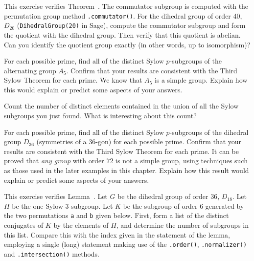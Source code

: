 \begin{sageverbatim}\end{sageverbatim}
%
%
This exercise verifies Theorem~.  The commutator subgroup is computed with the permutation group method \verb?.commutator()?.  For the dihedral group of order 40, $D_{20}$ (\verb?DihedralGroup(20)? in Sage), compute the commutator subgroup and form the quotient with the dihedral group.  Then verify that this quotient is abelian.  Can you identify the quotient group exactly (in other words, up to isomorphism)?
\begin{sageverbatim}\end{sageverbatim}
%
%
For each possible prime, find all of the distinct Sylow $p$-subgroups of the alternating group $A_5$.  Confirm that your results are consistent with the Third Sylow Theorem for each prime.  We know that $A_5$ is a simple group.  Explain how this would explain or predict some aspects of your answers.\par
%
Count the number of distinct elements contained in the union of all the Sylow subgroups you just found.  What is interesting about this count?
\begin{sageverbatim}\end{sageverbatim}
%
%
For each possible prime, find all of the distinct Sylow $p$-subgroups of the dihedral group $D_{36}$ (symmetries of a $36$-gon) for each possible prime.  Confirm that your results are consistent with the Third Sylow Theorem for each prime.  It can be proved that {\em any group} with order $72$ is not a simple group, using techniques such as those used in the later examples in this chapter.  Explain how this result would explain or predict some aspects of your answers.\begin{sageverbatim}\end{sageverbatim}
%
%
This exercise verifies Lemma~.  Let $G$ be the dihedral group of order $36$, $D_{18}$.  Let $H$ be the one Sylow $3$-subgroup.  Let $K$ be the subgroup of order $6$ generated by the two permutations \verb?a? and \verb?b? given below.  First, form a list of the distinct conjugates of $K$ by the elements of $H$, and determine the number of subgroups in this list.  Compare this with the index given in the statement of the lemma, employing a single (long) statement making use of the \verb?.order()?, \verb?.normalizer()? and \verb?.intersection()? methods.\par
